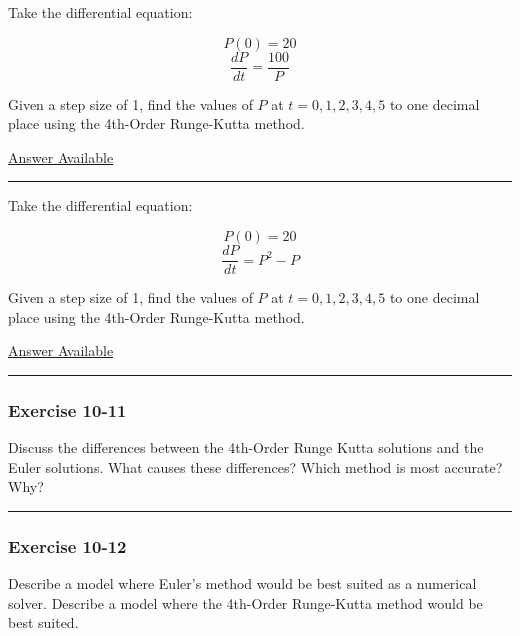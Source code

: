 \documentclass[]{memoir}
\begin{document}

Take the differential equation:

\[ P(0) = 20 \] \[ \frac{dP}{dt} = \frac{100}{P} \]

Given a step size of 1, find the values of $P$ at $t=0,1,2,3,4,5$ to one
decimal place using the 4th-Order Runge-Kutta method.

\hyperref[Ans-10-9]{Answer Available}

\begin{center}\rule{3in}{0.4pt}\end{center}


Take the differential equation:

\[ P(0) = 20 \] \[ \frac{dP}{dt} = P^2 - P \]

Given a step size of 1, find the values of $P$ at $t=0,1,2,3,4,5$ to one
decimal place using the 4th-Order Runge-Kutta method.

\hyperref[Ans-10-10]{Answer Available}

\begin{center}\rule{3in}{0.4pt}\end{center}

\subsubsection{Exercise 10-11}

Discuss the differences between the 4th-Order Runge Kutta solutions and
the Euler solutions. What causes these differences? Which method is most
accurate? Why?

\begin{center}\rule{3in}{0.4pt}\end{center}

\subsubsection{Exercise 10-12}

Describe a model where Euler's method would be best suited as a
numerical solver. Describe a model where the 4th-Order Runge-Kutta
method would be best suited.
\end{document}
